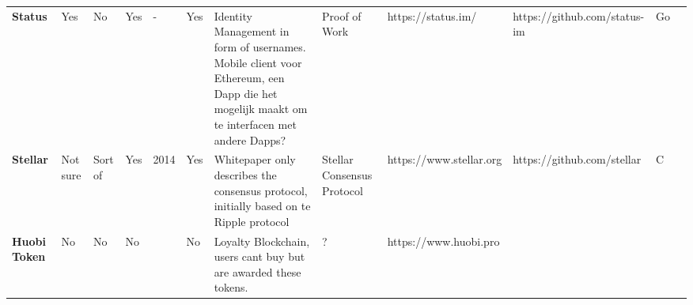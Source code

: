 \begin{table}[ht]
\begin{adjustbox}{width=25cm, height=6cm, angle=270}
\begin{tabular}{llllrlp{17.915em}rlrrr}
      \rowcolor[rgb]{ .267,  .447,  .769} \textcolor[rgb]{ 1,  1,  1}{\textbf{Status}} & \cellcolor[rgb]{ .776,  .937,  .808}\textcolor[rgb]{ 0,  .38,  0}{Yes} & \cellcolor[rgb]{ 1,  .78,  .808}\textcolor[rgb]{ .612,  0,  .024}{No} & \cellcolor[rgb]{ .776,  .937,  .808}\textcolor[rgb]{ 0,  .38,  0}{Yes} & \multicolumn{1}{l}{\cellcolor[rgb]{ 1,  1,  1}-} & \cellcolor[rgb]{ .776,  .937,  .808}\textcolor[rgb]{ 0,  .38,  0}{Yes} & \cellcolor[rgb]{ .851,  .882,  .949}\textcolor[rgb]{ .188,  .329,  .588}{Identity Management in form of usernames. Mobile client voor Ethereum, een Dapp die het mogelijk maakt om te interfacen met andere Dapps?} & \multicolumn{1}{l}{\cellcolor[rgb]{ .851,  .882,  .949}\textcolor[rgb]{ .188,  .329,  .588}{Proof of Work}} & \cellcolor[rgb]{ 1,  1,  1}https://status.im/ & \multicolumn{1}{l}{\cellcolor[rgb]{ 1,  1,  1}https://github.com/status-im} & \multicolumn{1}{l}{\cellcolor[rgb]{ .851,  .882,  .949}\textcolor[rgb]{ .188,  .329,  .588}{Go}} & \cellcolor[rgb]{ 1,  1,  1} \\
      \rowcolor[rgb]{ .267,  .447,  .769} \textcolor[rgb]{ 1,  1,  1}{\textbf{Stellar}} & \cellcolor[rgb]{ 1,  .922,  .612}\textcolor[rgb]{ .612,  .341,  0}{Not sure} & \cellcolor[rgb]{ 1,  .922,  .612}\textcolor[rgb]{ .612,  .341,  0}{Sort of} & \cellcolor[rgb]{ .776,  .937,  .808}\textcolor[rgb]{ 0,  .38,  0}{Yes} & \cellcolor[rgb]{ .851,  .882,  .949}\textcolor[rgb]{ .188,  .329,  .588}{2014} & \cellcolor[rgb]{ .776,  .937,  .808}\textcolor[rgb]{ 0,  .38,  0}{Yes} & \cellcolor[rgb]{ 1,  1,  1}\textcolor[rgb]{ .188,  .329,  .588}{Whitepaper only describes the consensus protocol, initially based on te Ripple protocol} & \multicolumn{1}{l}{\cellcolor[rgb]{ .851,  .882,  .949}\textcolor[rgb]{ .188,  .329,  .588}{Stellar Consensus Protocol}} & \cellcolor[rgb]{ .851,  .882,  .949}\textcolor[rgb]{ .188,  .329,  .588}{https://www.stellar.org} & \multicolumn{1}{l}{\cellcolor[rgb]{ .851,  .882,  .949}\textcolor[rgb]{ .188,  .329,  .588}{https://github.com/stellar}} & \multicolumn{1}{l}{\cellcolor[rgb]{ .851,  .882,  .949}\textcolor[rgb]{ .188,  .329,  .588}{C}} & \cellcolor[rgb]{ .851,  .882,  .949}\textcolor[rgb]{ .188,  .329,  .588}{} \\
      \rowcolor[rgb]{ .267,  .447,  .769} \textcolor[rgb]{ 1,  1,  1}{\textbf{Huobi Token}} & \cellcolor[rgb]{ 1,  .78,  .808}\textcolor[rgb]{ .612,  0,  .024}{No} & \cellcolor[rgb]{ 1,  .78,  .808}\textcolor[rgb]{ .612,  0,  .024}{No} & \cellcolor[rgb]{ 1,  .78,  .808}\textcolor[rgb]{ .612,  0,  .024}{No} & \cellcolor[rgb]{ 1,  1,  1} & \cellcolor[rgb]{ 1,  .78,  .808}\textcolor[rgb]{ .612,  0,  .024}{No} & \cellcolor[rgb]{ .851,  .882,  .949}\textcolor[rgb]{ .188,  .329,  .588}{Loyalty Blockchain, users cant buy but are awarded these tokens.} & \multicolumn{1}{l}{\cellcolor[rgb]{ .851,  .882,  .949}\textcolor[rgb]{ .188,  .329,  .588}{?}} & \cellcolor[rgb]{ 1,  1,  1}https://www.huobi.pro & \cellcolor[rgb]{ 1,  1,  1} & \cellcolor[rgb]{ 1,  1,  1} & \cellcolor[rgb]{ 1,  1,  1} \\

\end{tabular}
\end{adjustbox}
\end{table}
